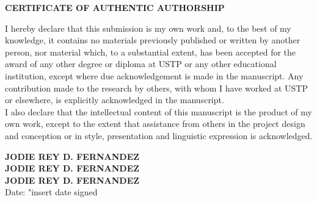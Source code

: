 {\baselineskip

\begin{center}
{\bf CERTIFICATE OF AUTHENTIC AUTHORSHIP}\\[24pt]
\end{center}

I hereby declare that this submission is my own work and, to the best of my knowledge, it contains no materials previously published or written by another person, nor material which, to a substantial extent, has been accepted for the award of any other degree or diploma at USTP or any other educational institution, except where due acknowledgement is made in the manuscript. Any contribution made to the research by others, with whom I have worked at USTP or elsewhere, is explicitly acknowledged in the manuscript.\\

I also declare that the intellectual content of this manuscript is the product of my own work, except to the extent that assistance from others in the project design and conception or in style, presentation and linguistic expression is acknowledged.\\[12pt]

\begin{flushright}
\textbf{JODIE REY D. FERNANDEZ}\\
\bigskip
\textbf{JODIE REY D. FERNANDEZ}\\
\bigskip
\textbf{JODIE REY D. FERNANDEZ}\\
Date: "insert date signed
\end{flushright}

}